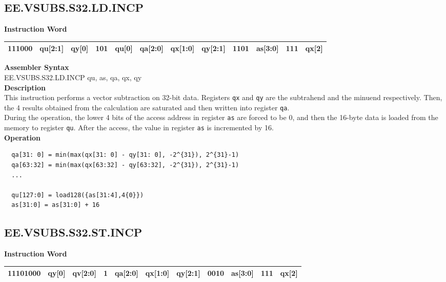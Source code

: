\clearpage
\subsection{EE.VSUBS.S32.LD.INCP}\label{instruction:EEVSUBSS32LDINCP}
\setlength\tabcolsep{6pt}
\textbf{Instruction Word} \\
\begin{tabular}{|c|c|c|c|c|c|c|c|c|c|c|c|}
	\hline
	111000 & qu[2:1] & qy[0] & 101 & qu[0] & qa[2:0] & qx[1:0] & qy[2:1] & 1101 & as[3:0] & 111 & qx[2] \\
	\hline
\end{tabular}

\textbf{Assembler Syntax} \\
EE.VSUBS.S32.LD.INCP qu, as, qa, qx, qy \\
\textbf{Description} \\
This instruction performs a vector subtraction on 32-bit data. Registers \lstinline{qx} and \lstinline{qy} are the subtrahend and the minuend respectively. Then, the 4 results obtained from the calculation are saturated and then written into register \lstinline{qa}. \\ During the operation, the lower 4 bits of the access address in register \lstinline{as} are forced to be 0, and then the 16-byte data is loaded from the memory to register \lstinline{qu}. After the access, the value in register \lstinline{as} is incremented by 16.\\
\textbf{Operation}
\begin{lstlisting}
  qa[31: 0] = min(max(qx[31: 0] - qy[31: 0], -2^{31}), 2^{31}-1)
  qa[63:32] = min(max(qx[63:32] - qy[63:32], -2^{31}), 2^{31}-1)
  ...

  qu[127:0] = load128({as[31:4],4{0}})
  as[31:0] = as[31:0] + 16
\end{lstlisting}

\clearpage
\subsection{EE.VSUBS.S32.ST.INCP}\label{instruction:EEVSUBSS32STINCP}
\setlength\tabcolsep{6pt}
\textbf{Instruction Word} \\
\begin{tabular}{|c|c|c|c|c|c|c|c|c|c|c|}
	\hline
	11101000 & qy[0] & qv[2:0] & 1 & qa[2:0] & qx[1:0] & qy[2:1] & 0010 & as[3:0] & 111 & qx[2] \\
	\hline
\end{tabular}

